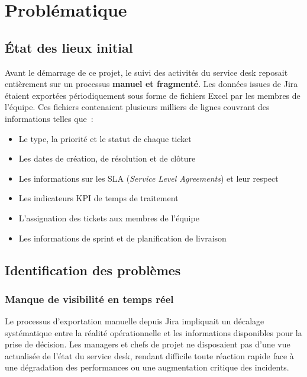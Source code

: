 \documentclass[12pt, a4paper]{report}
\begin{document}
\chapter{Problématique}

\section{État des lieux initial}

Avant le démarrage de ce projet, le suivi des activités du service desk reposait entièrement sur un processus \textbf{manuel et fragmenté}. Les données issues de Jira étaient exportées périodiquement sous forme de fichiers Excel par les membres de l'équipe. Ces fichiers contenaient plusieurs milliers de lignes couvrant des informations telles que~:

\begin{itemize}[leftmargin=2em]
    \item Le type, la priorité et le statut de chaque ticket
    \item Les dates de création, de résolution et de clôture
    \item Les informations sur les SLA (\textit{Service Level Agreements}) et leur respect
    \item Les indicateurs KPI de temps de traitement
    \item L'assignation des tickets aux membres de l'équipe
    \item Les informations de sprint et de planification de livraison
\end{itemize}

\section{Identification des problèmes}

\subsection{Manque de visibilité en temps réel}

Le processus d'exportation manuelle depuis Jira impliquait un décalage systématique entre la réalité opérationnelle et les informations disponibles pour la prise de décision. Les managers et chefs de projet ne disposaient pas d'une vue actualisée de l'état du service desk, rendant difficile toute réaction rapide face à une dégradation des performances ou une augmentation critique des incidents.
\end{document}
